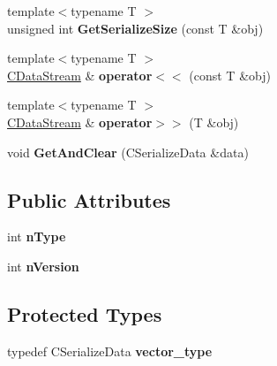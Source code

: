 \begin{DoxyCompactItemize}
\mbox{\label{class_c_data_stream_aaf2b9e953793ce5a4fc438a7ecb00dc2}} 
{\footnotesize template$<$typename T $>$ }\\unsigned int {\bfseries Get\+Serialize\+Size} (const T \&obj)
\item 
\mbox{\label{class_c_data_stream_af47c6d4051064a226f529ee4d7c13ad7}} 
{\footnotesize template$<$typename T $>$ }\\\mbox{\hyperlink{class_c_data_stream}{C\+Data\+Stream}} \& {\bfseries operator$<$$<$} (const T \&obj)
\item 
\mbox{\label{class_c_data_stream_ac80cfc65569416f8c23e328edb4cadae}} 
{\footnotesize template$<$typename T $>$ }\\\mbox{\hyperlink{class_c_data_stream}{C\+Data\+Stream}} \& {\bfseries operator$>$$>$} (T \&obj)
\item 
\mbox{\label{class_c_data_stream_a4be60514b69c71a722e16bf1fbbc3c6c}} 
void {\bfseries Get\+And\+Clear} (C\+Serialize\+Data \&data)
\end{DoxyCompactItemize}
\subsection*{Public Attributes}
\begin{DoxyCompactItemize}
\item 
\mbox{\label{class_c_data_stream_a2b646679e24cf6f382fe8ab2d4f50f35}} 
int {\bfseries n\+Type}
\item 
\mbox{\label{class_c_data_stream_a074998c6b7c8aa17a1a90dbc414b605d}} 
int {\bfseries n\+Version}
\end{DoxyCompactItemize}
\subsection*{Protected Types}
\begin{DoxyCompactItemize}
\item 
\mbox{\label{class_c_data_stream_a5e86187632a0d6cea39f3ea525427e27}} 
typedef C\+Serialize\+Data {\bfseries vector\+\_\+type}
\end{DoxyCompactItemize}
